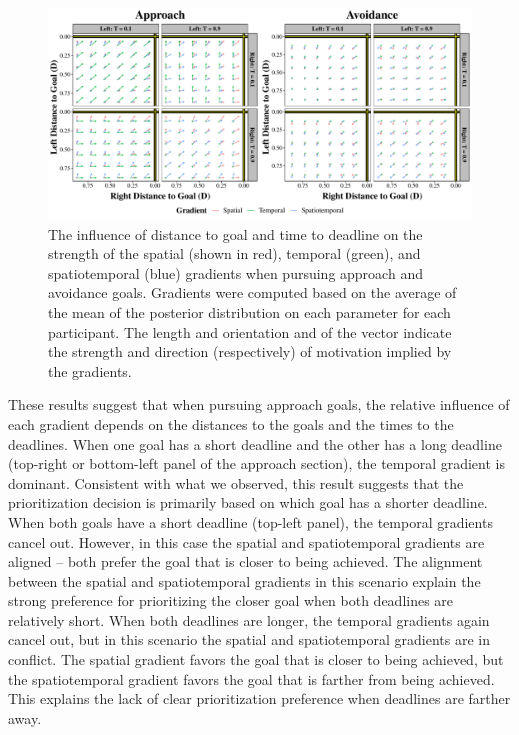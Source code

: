 \documentclass[a4paper,doc,natbib,donotrepeattitle]{apa6}
\begin{document}
\begin{figure}[h!]
\centering
\includegraphics[width=1\textwidth]{mean_gradients_norm.pdf}
\caption{\label{fig:mean_gradients} The influence of distance to goal and time to deadline on the strength of the spatial (shown in red), temporal (green), and spatiotemporal (blue) gradients when pursuing approach and avoidance goals. Gradients were computed based on the average of the mean of the posterior distribution on each parameter for each participant. The length and orientation and of the vector indicate the strength and direction (respectively) of motivation implied by the gradients.}
\end{figure}

These results suggest that when pursuing approach goals, the relative influence of each gradient depends on the distances to the goals and the times to the deadlines. When one goal has a short deadline and the other has a long deadline (top-right or bottom-left panel of the approach section), the temporal gradient is dominant. Consistent with what we observed, this result suggests that the prioritization decision is primarily based on which goal has a shorter deadline. When both goals have a short deadline (top-left panel), the temporal gradients cancel out. However, in this case the spatial and spatiotemporal gradients are aligned -- both prefer the goal that is closer to being achieved. The alignment between the spatial and spatiotemporal gradients in this scenario explain the strong preference for prioritizing the closer goal when both deadlines are relatively short. When both deadlines are longer, the temporal gradients again cancel out, but in this scenario the spatial and spatiotemporal gradients are in conflict. The spatial gradient favors the goal that is closer to being achieved, but the spatiotemporal gradient favors the goal that is farther from being achieved. This explains the lack of clear prioritization preference when deadlines are farther away.
\end{document}
